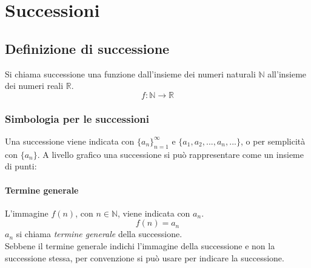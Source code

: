 \documentclass[a4paper,12pt, oneside]{book}
\begin{document}
\chapter{Successioni}
\section{Definizione di successione}
Si chiama successione una funzione dall'insieme dei numeri naturali $\mathbb{N}$ all'insieme dei numeri reali $\mathbb{R}$.
\begin{equation}
	f\colon\mathbb{N}\to \mathbb{R}
\end{equation}
\subsection{Simbologia per le successioni}
Una successione viene indicata con $\{a_n\}_{n=1}^{\infty}$ e $\{ a_1, a_2, ..., a_n, ... \}$, o per semplicità con $\{a_n\}$. A livello grafico una successione si può rappresentare come un insieme di punti:
\begin{center}
\end{center}
\subsubsection{Termine generale} 
L'immagine $f(n)$, con $n \in \mathbb{N}$, viene indicata con $a_n$.
\begin{equation}
	f(n) = a_n
\end{equation}
$a_n$ si chiama \emph{termine generale} della successione.\\
Sebbene il termine generale indichi l'immagine della successione e non la successione stessa, per convenzione si può usare per indicare la successione.
\end{document}
